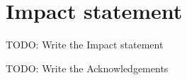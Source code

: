 \chapter*{\centering Impact statement}
TODO: Write the Impact statement

\begin{acknowledgements} %
    TODO: Write the Acknowledgements
\end{acknowledgements}

\tableofcontents %
\listoffigures %
\listoftables %